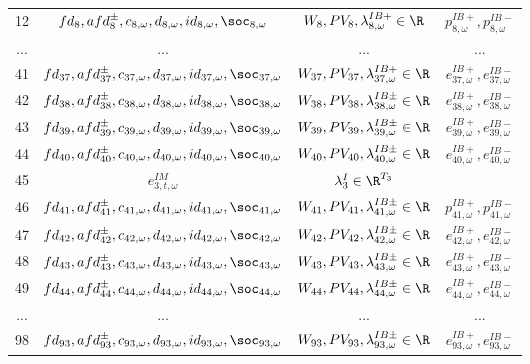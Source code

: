 \begin{table}[H]
\begin{tabular}{c c c c}
	12& $fd_8, afd^{\pm}_8, c_{8, \omega}, d_{8, \omega}, id_{8, \omega}, \soc_{8, \omega}$ & $W_8, PV_8, \lambda^{IB+}_{8, \omega} \in \R$ & $p^{IB+}_{8, \omega}, p^{IB-}_{8, \omega}$ \\
    ...&...&...&...\\
	41& $fd_{37}, afd^{\pm}_{37}, c_{37, \omega}, d_{37, \omega}, id_{37, \omega}, \soc_{37, \omega}$ & $W_{37}, PV_{37}, \lambda^{IB+}_{37, \omega} \in \R$ & $e^{IB+}_{37, \omega}, e^{IB-}_{37, \omega}$\\
	42& $fd_{38}, afd^{\pm}_{38}, c_{38, \omega}, d_{38, \omega}, id_{38, \omega}, \soc_{38, \omega}$ & $W_{38}, PV_{38}, \lambda^{IB\pm}_{38, \omega} \in \R$ & $e^{IB+}_{38, \omega}, e^{IB-}_{38, \omega}$\\
    43& $fd_{39}, afd^{\pm}_{39}, c_{39, \omega}, d_{39, \omega}, id_{39, \omega}, \soc_{39, \omega}$ & $W_{39}, PV_{39}, \lambda^{IB\pm}_{39, \omega} \in \R$ & $e^{IB+}_{39, \omega}, e^{IB-}_{39, \omega}$\\
	44& $fd_{40}, afd^{\pm}_{40}, c_{40, \omega}, d_{40, \omega}, id_{40, \omega}, \soc_{40, \omega}$ & $W_{40}, PV_{40}, \lambda^{IB\pm}_{40, \omega} \in \R$ & $e^{IB+}_{40, \omega}, e^{IB-}_{40, \omega}$\\
	45& $e^{IM}_{3, t, \omega}$ & $\lambda^I_3 \in \R^{T_3}$&\\
	46& $fd_{41}, afd^{\pm}_{41}, c_{41, \omega}, d_{41, \omega}, id_{41, \omega}, \soc_{41, \omega}$ & $W_{41}, PV_{41}, \lambda^{IB\pm}_{41, \omega} \in \R$ & $p^{IB+}_{41, \omega}, p^{IB-}_{41, \omega}$ \\
	47& $fd_{42}, afd^{\pm}_{42}, c_{42, \omega}, d_{42, \omega}, id_{42, \omega}, \soc_{42, \omega}$ & $W_{42}, PV_{42}, \lambda^{IB\pm}_{42, \omega} \in \R$ & $e^{IB+}_{42, \omega}, e^{IB-}_{42, \omega}$\\
	48& $fd_{43}, afd^{\pm}_{43}, c_{43, \omega}, d_{43, \omega}, id_{43, \omega}, \soc_{43, \omega}$ & $W_{43}, PV_{43}, \lambda^{IB\pm}_{43, \omega} \in \R$ & $e^{IB+}_{43, \omega}, e^{IB-}_{43, \omega}$\\
	49& $fd_{44}, afd^{\pm}_{44}, c_{44, \omega}, d_{44, \omega}, id_{44, \omega}, \soc_{44, \omega}$ & $W_{44}, PV_{44}, \lambda^{IB\pm}_{44, \omega} \in \R$ & $e^{IB+}_{44, \omega}, e^{IB-}_{44, \omega}$\\
    ...&...&...&...\\
	98& $fd_{93}, afd^{\pm}_{93}, c_{93, \omega}, d_{93, \omega}, id_{93, \omega}, \soc_{93, \omega}$ & $W_{93}, PV_{93}, \lambda^{IB\pm}_{93, \omega} \in \R$ & $e^{IB+}_{93, \omega}, e^{IB-}_{93, \omega}$\\

\end{tabular}
\end{table}
